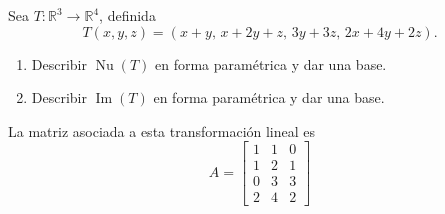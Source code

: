 \documentclass[handout]{beamer} %
\newcommand{\img}{\operatorname{Im}}
\newcommand{\nuc}{\operatorname{Nu}}
\newcommand{\R}{\mathbb R}
\begin{document}
\begin{frame}
    \begin{ejemplo*}
        Sea $T: \R^3 \to \R^4$, definida
        $$
        T(x,y,z) = (x +y ,\,x +2y +z,\,3y +3z,\,2x +4y +2z).
        $$
        \begin{enumerate}
            \item Describir $\nuc(T)$  en forma paramétrica y dar una base.
            \item Describir $\img(T)$  en forma paramétrica y  dar una base. 
        \end{enumerate}
        \end{ejemplo*}\pause
        \begin{solucion}\pause
            La matriz asociada a esta transformación lineal  es 
            \begin{equation*}
                A = \begin{bmatrix}
                1&1&0\\1&2&1\\0&3&3\\2&4&2
                \end{bmatrix}
            \end{equation*}
        \end{solucion}
        \end{frame}


        
\end{document}
